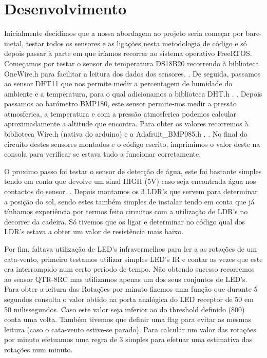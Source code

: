 \documentclass[11pt]{report}
\begin{document}
\clearpage

\section*{Desenvolvimento}

Inicialmente decidimos que a nossa abordagem ao projeto seria começar por bare-metal, testar todos os sensores e as ligações nesta metodologia de código e só depois passar à parte em que iríamos recorrer ao sistema operativo FreeRTOS. \\

Começamos por testar o sensor de temperatura DS18B20 recorrendo à biblioteca OneWire.h \cite{OneWire}  para facilitar a leitura dos dados dos sensores. \cite{WaterproofDS18B20} \cite{sparkfunDS18B20}. De seguida, passamos ao sensor DHT11 que nos permite medir a percentagem de humidade do ambiente e a temperatura, para o qual adicionamos a biblioteca DHT.h \cite{DHTadafruit}. \cite{DHT}. Depois passamos ao barómetro BMP180, este sensor permite-nos medir a pressão atmosferica, a temperatura e com a pressão atmosferica podemos calcular aproximadamente a altitude que encontra.  Para obter os valores recorremos à biblioteca  Wire.h  (nativa do arduino) e a  Adafruit\_BMP085.h \cite{bmpBiblio}. \cite{bmp}. No final do circuito destes sensores montados e o código escrito, imprimimos o valor deste na consola para verificar se estava tudo a funcionar corretamente. \linebreak

O proximo passo foi testar o sensor de detecção de água, este foi bastante simples tendo em conta que devolve um sinal HIGH (5V) caso seja encontrada água nos contactos do sensor. \cite{water}. Depois montamos os 3 LDR's que servem para determinar a posição do sol, sendo estes também simples de instalar tendo em conta que já tínhamos experiência por termos feito circuitos com a utilização de LDR's no decorrer da cadeira. Só tivemos que os ligar e determinar no código qual dos LDR's estava a obter um valor de resistência mais baixo. \linebreak

Por fim, faltava utilização de LED's infravermelhos para ler a as rotações de um cata-vento, primeiro testamos utilizar simples LED's IR e contar as vezes que este era interrompido num certo período de tempo. Não obtendo sucesso recorremos ao sensor QTR-8RC mas utilizamos apenas um dos seus conjuntos de LED's. Para obter a leitura das Rotações por minuto fizemos uma função que durante 5 segundos consulta o valor obtido na porta analógica do LED receptor de 50 em 50 milissegundos. Caso este valor seja inferior ao do threshold definido (800) conta uma volta. Também tivemos que definir uma flag para evitar as mesmas leitura (caso o cata-vento estive-se parado). Para calcular um valor das rotações por minuto efetuamos uma regra de 3 simples para efetuar uma estimativa das rotações num minuto. \pagebreak
\end{document}
